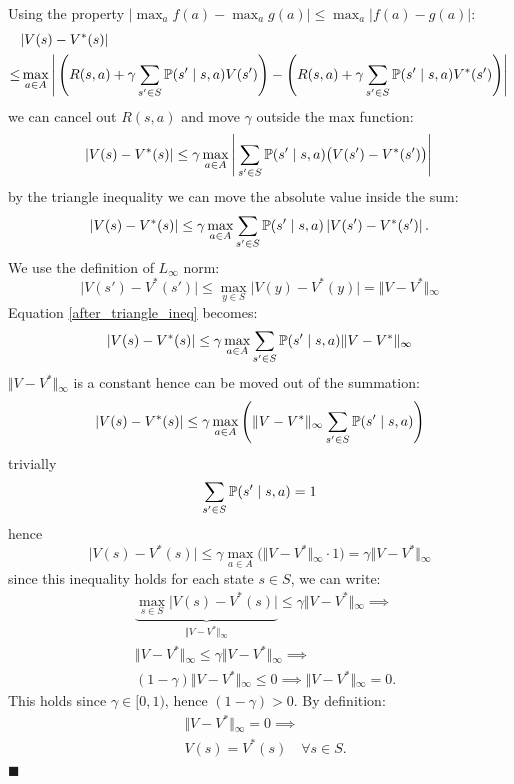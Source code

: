 \documentclass[10pt, a4paper]{report}
\begin{document}
Using the property $\displaystyle\vert{}\max_a f(a) - \max_a g(a)\vert{} \le \max_a \vert{}f(a) - g(a)\vert{}$: \begin{align}
    &\vert{}V(s) - V^*(s)\vert{}\\ \le &\max_{a \in {A}} \left\vert{} \left( R(s, a) + \gamma \sum_{s' \in {S}} {\mathbb P}(s' \mid s, a) V(s') \right) - \left( R(s, a) + \gamma \sum_{s' \in {S}} {\mathbb P}(s' \mid s, a) V^*(s') \right) \right\vert{} 
\end{align}
we can cancel out $R(s,a)$ and move $\gamma$ outside the max function:\begin{equation}
    \vert{}V(s) - V^*(s)\vert{} \le \gamma \max_{a \in {A}} \left\vert{} \sum_{s' \in {S}} {\mathbb P}(s' \mid s, a) \big( V(s') - V^*(s') \big) \right\vert{} 
\end{equation}
by the triangle inequality we can move the absolute value inside the sum:\begin{equation}\label{after_triangle_ineq}
    \vert{}V(s) - V^*(s)\vert{} \le \gamma \max_{a \in {A}}  \sum_{s' \in {S}} {\mathbb P}(s' \mid s, a)\left\vert{}  V(s') - V^*(s')  \right\vert{} .
\end{equation}
We use the definition of $L_\infty$ norm:\begin{equation}
    \vert{}V(s') - V^*(s')\vert{} \le \max_{y \in {S}} \vert{}V(y) - V^*(y)\vert{} = \Vert{}V - V^*\Vert{}_\infty
\end{equation}
Equation \eqref{after_triangle_ineq} becomes:\begin{equation}
    \vert{}V(s) - V^*(s)\vert{} \le \gamma \max_{a \in {A}} \sum_{s' \in {S}} {\mathbb P}(s' \mid s, a) \Vert{}V - V^*\Vert{}_\infty 
\end{equation}
$\Vert{}V - V^*\Vert{}_\infty$ is a constant hence can be moved out of the summation:\begin{equation}
    \vert{}V(s) - V^*(s)\vert{} \le \gamma \max_{a \in {A}} \left( \Vert{}V - V^*\Vert{}_\infty \sum_{s' \in {S}} {\mathbb P}(s' \mid s, a) \right)
\end{equation}
trivially
$$\sum_{s' \in {S}} {\mathbb P}(s' \mid s, a)=1$$
hence
\begin{equation}
    \vert{}V(s) - V^*(s)\vert{} \le \gamma \max_{a \in {A}} \Big( \Vert{}V - V^*\Vert{}_\infty \cdot 1 \Big) = \gamma \Vert{}V - V^*\Vert{}_\infty
\end{equation}
since this inequality holds for each state $s\in S$, we can write:\begin{align}
    &\underbrace{\max_{s \in {S}} \vert{}V(s) - V^*(s)\vert{}}_{\Vert{}V - V^*\Vert{}_\infty} \le \gamma \Vert{}V - V^*\Vert{}_\infty\implies\\[1.5ex]
    &\Vert{}V - V^*\Vert{}_\infty \le \gamma \Vert{}V - V^*\Vert{}_\infty \implies \\[1.5ex]
    &(1 - \gamma) \Vert{}V - V^*\Vert{}_\infty \le 0\implies  \Vert{}V - V^*\Vert{}_\infty =0.
\end{align}
This holds since $\gamma\in[0,1)$, hence $(1-\gamma)> 0$. By definition:\begin{align}
    &\Vert{}V - V^*\Vert{}_\infty =0\implies \\ 
    &V(s) = V^*(s) \quad \forall s \in {S}.
\end{align}
\hfill$\blacksquare$\bigskip
\end{document}
